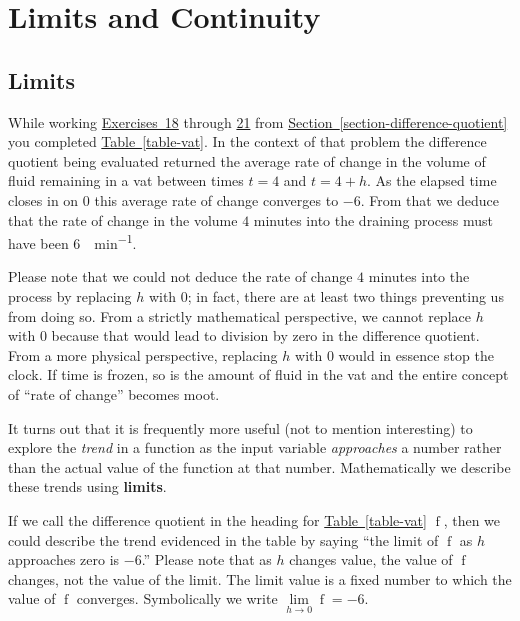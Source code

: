 \documentclass[12pt,]{book}
\newcommand{\terminology}[1]{\textbf{#1}}
\theoremstyle{plain}
\theoremstyle{definition}
\numberwithin{equation}{section}
\newcommand{\fe}[2]{\mathop{{#1}{\left(#2\right)}}}
\begin{document}
\chapter[Limits and Continuity]{Limits and Continuity}\label{chapter-limits}
\typeout{************************************************}
\typeout{************************************************}
\section[Limits]{Limits}\label{section-limits}
While working \hyperref[exercise-vat-first]{Exercises~18} through \hyperref[exercise-vat-last]{21} from \hyperref[section-difference-quotient]{Section~\ref*{section-difference-quotient}} you completed \hyperref[table-vat]{Table~\ref*{table-vat}}. In the context of that problem the difference quotient being evaluated returned the average rate of change in the volume of fluid remaining in a vat between times \(t=4\) and \(t=4+h\). As the elapsed time closes in on \(0\) this average rate of change converges to \(-6\). From that we deduce that the rate of change in the volume \(4\) minutes into the draining process must have been \SI{6}{\gallon\per\minute}.%
\par
Please note that we could not deduce the rate of change \(4\) minutes into the process by replacing \(h\) with \(0\); in fact, there are at least two things preventing us from doing so. From a strictly mathematical perspective, we cannot replace \(h\) with \(0\) because that would lead to division by zero in the difference quotient. From a more physical perspective, replacing \(h\) with \(0\) would in essence stop the clock. If time is frozen, so is the amount of fluid in the vat and the entire concept of ``rate of change'' becomes moot.%
\par
It turns out that it is frequently more useful (not to mention interesting) to explore the \emph{trend} in a function as the input variable \emph{approaches} a number rather than the actual value of the function at that number. Mathematically we describe these trends using \terminology{limits}.%
\par
If we call the difference quotient in the heading for \hyperref[table-vat]{Table~\ref*{table-vat}} \(\fe{f}{h}\), then we could describe the trend evidenced in the table by saying ``the limit of \(\fe{f}{h}\) as \(h\) approaches zero is \(-6\).'' Please note that as \(h\) changes value, the value of \(\fe{f}{h}\) changes, not the value of the limit. The limit value is a fixed number to which the value of \(\fe{f}{h}\) converges. Symbolically we write \(\lim\limits_{h\to0}\fe{f}{h}=-6\).%
\end{document}
